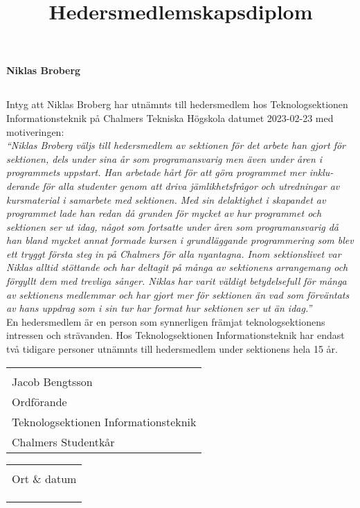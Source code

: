 \documentclass[11pt, noincludeaddress, nopagination]{classes/cthit}
\makeatletter
\newcommand{\sign}[4]{%
  \begin{tabular}[t]{@{}l@{}}
  \makebox[6.5cm]{\dotfill}\\
  \strut#1\strut \\
  \strut#2\strut \\
  \strut#3\strut \\
  \strut#4\strut \\
  \end{tabular}%
}
\makeatother
\begin{document}
\title{Hedersmedlemskapsdiplom}

\makeheadfoot%

\makesimpletitle
\begin{center}
\textbf{\Huge{Niklas Broberg}}
\end{center}
\vspace{1cm}
\subsection*{}
Intyg att Niklas Broberg har utnämnts till hedersmedlem hos Teknologsektionen Informationsteknik på Chalmers Tekniska Högskola datumet 2023-02-23 med motiveringen: 
\\
\textit{
``Niklas Broberg väljs till hedersmedlem av sektionen för det arbete han gjort för sektionen, dels under sina år som programansvarig men även under åren i programmets uppstart. Han arbetade hårt för att göra programmet mer inklu- derande för alla studenter genom att driva jämlikhetsfrågor och utredningar av kursmaterial i samarbete med sektionen. Med sin delaktighet i skapandet av programmet lade han redan då grunden för mycket av hur programmet och sektionen ser ut idag, något som fortsatte under åren som programansvarig då han bland mycket annat formade kursen i grundläggande programmering som blev ett tryggt första steg in på Chalmers för alla nyantagna. Inom sektionslivet var Niklas alltid stöttande och har deltagit på många av sektionens arrangemang och förgyllt dem med trevliga sånger. Niklas har varit väldigt betydelsefull för många av sektionens medlemmar och har gjort mer för sektionen än vad som förväntats av hans uppdrag som i sin tur har format hur sektionen ser ut än idag.''
}
\\
En hedersmedlem är en person som synnerligen främjat teknologsektionens intressen och strävanden. Hos Teknologsektionen Informationsteknik har endast två tidigare personer utnämnts till hedersmedlem under sektionens hela 15 år.

\vspace{4cm} 

\noindent
  \begin{minipage}[t]{0.5\linewidth}
    \raggedright
    \sign{Jacob Bengtsson}{Ordförande}{Teknologsektionen Informationsteknik}{Chalmers Studentkår}
  \end{minipage}%
  \hfill
  \begin{minipage}[t]{0.5\linewidth}
  \sign{Ort \& datum}{}{}{}
  \end{minipage}
\end{document}
